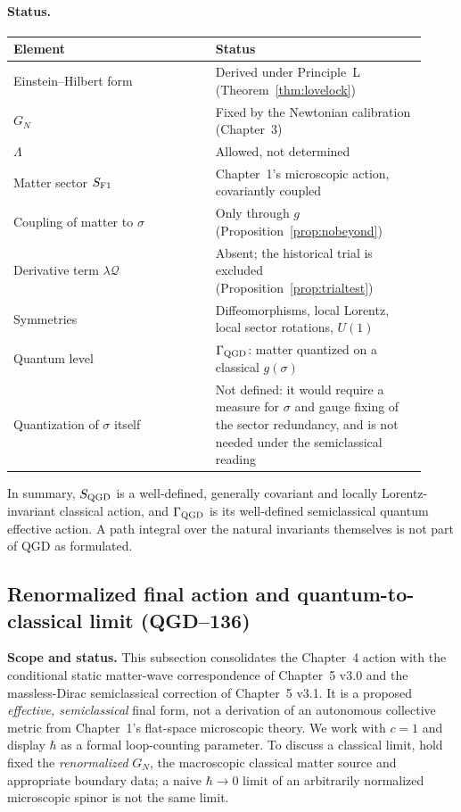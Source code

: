 \documentclass[11pt,a4paper]{article}
\begin{document}
\paragraph{Status.}
\begin{center}\small
\begin{tabular}{@{}p{0.45\linewidth}p{0.47\linewidth}@{}}\toprule
Element & Status\\\midrule
Einstein--Hilbert form & Derived under Principle~L (Theorem~\ref{thm:lovelock})\\
$G_N$ & Fixed by the Newtonian calibration (Chapter~3)\\
$\Lambda$ & Allowed, not determined\\
Matter sector $S_{\rm F1}$ & Chapter~1's microscopic action, covariantly coupled\\
Coupling of matter to $\sigma$ & Only through $g$ (Proposition~\ref{prop:nobeyond})\\
Derivative term $\lambda\mathcal Q$ & Absent; the historical trial is excluded (Proposition~\ref{prop:trialtest})\\
Symmetries & Diffeomorphisms, local Lorentz, local sector rotations, $U(1)$\\
Quantum level & $\Gamma_{\rm QGD}$: matter quantized on a classical $g(\sigma)$\\
Quantization of $\sigma$ itself & Not defined: it would require a measure for $\sigma$ and gauge fixing
of the sector redundancy, and is not needed under the semiclassical reading\\\bottomrule
\end{tabular}
\end{center}
\noindent In summary, $S_{\rm QGD}$ is a well-defined, generally covariant and locally
Lorentz-invariant classical action, and $\Gamma_{\rm QGD}$ is its well-defined semiclassical
quantum effective action. A path integral over the natural invariants themselves is not
part of QGD as formulated.

\subsection{Renormalized final action and quantum-to-classical limit (QGD--136)}
\label{sec:qgd136final}
\noindent\textbf{Scope and status.}
This subsection consolidates the Chapter~4 action with the conditional static
matter-wave correspondence of Chapter~5 v3.0 and the massless-Dirac
semiclassical correction of Chapter~5 v3.1. It is a proposed \emph{effective,
semiclassical} final form, not a derivation of an autonomous collective
metric from Chapter~1's flat-space microscopic theory. We work with $c=1$
and display $\hbar$ as a formal loop-counting parameter. To discuss a
classical limit, hold fixed the \emph{renormalized} $G_N$, the macroscopic
classical matter source and appropriate boundary data; a naive $\hbar\to0$
limit of an arbitrarily normalized microscopic spinor is not the same limit.
\end{document}
